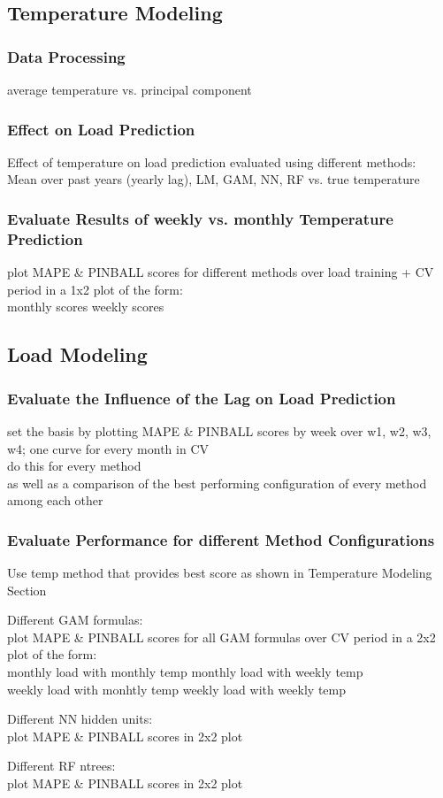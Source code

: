 \documentclass[conference]{IEEEtran}
\begin{document}
\subsection{Temperature Modeling}
\subsubsection{Data Processing}
average temperature vs. principal component

\subsubsection{Effect on Load Prediction}
Effect of temperature on load prediction evaluated using different methods:\\
Mean over past years (yearly lag), LM, GAM, NN, RF vs. true temperature

\subsubsection{Evaluate Results of weekly vs. monthly Temperature Prediction}
plot MAPE \& PINBALL scores for different methods over load training + CV period in a 1x2 plot of the form:\\
monthly scores \quad weekly scores

\subsection{Load Modeling}

\subsubsection{Evaluate the Influence of the Lag on Load Prediction}
set the basis by plotting MAPE \& PINBALL scores by week over w1, w2, w3, w4; one curve for every month in CV\\
do this for every method\\
as well as a comparison of the best performing configuration of every method among each other\\

\subsubsection{Evaluate Performance for different Method Configurations}
Use temp method that provides best score as shown in Temperature Modeling Section\par
Different GAM formulas:\\
plot MAPE \& PINBALL scores for all GAM formulas over CV period in a 2x2 plot of the form:\\
monthly load with monthly temp \quad monthly load with weekly temp\\
weekly load with monhtly temp \quad weekly load with weekly temp\par
\vspace*{5pt}
Different NN hidden units:\\
plot MAPE \& PINBALL scores in 2x2 plot\par
Different RF ntrees:\\ 
plot MAPE \& PINBALL scores in 2x2 plot\par
\end{document}
